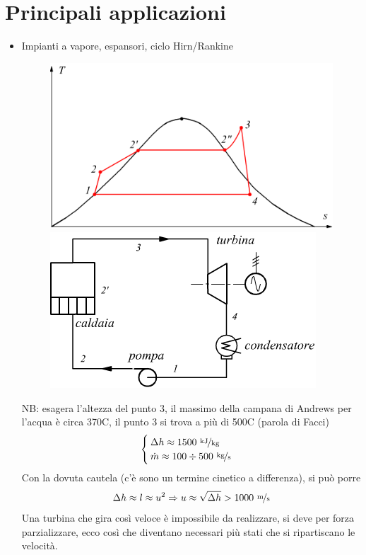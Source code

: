 \documentclass[a4paper, 15pt]{article}
\begin{document}
\newpage


 \section{Principali applicazioni}
\begin{adjustwidth}{2in}{}
	\begin{itemize}
		\item Impianti a vapore, espansori, ciclo Hirn/Rankine
		\begin{figure}[H]
			\centering
			\includegraphics[width=0.4\linewidth]{immagini/hirn2}
			\includegraphics[width=0.4\linewidth]{immagini/hirn}
			\label{fig:hirn2}
			\label{fig:hirn}
		\end{figure}
	NB: esagera l'altezza del punto 3, il massimo della campana di Andrews per l'acqua è circa 370\degree C, il punto 3 si trova a più di 500\degree C (parola di Facci)
		\[\begin{cases}
			\Delta h \approx 1500~\nicefrac{\text{kJ}}{\text{kg}} \\
			\dot{m} \approx 100\div500~\nicefrac{\text{kg}}{\text{s}}
		\end{cases}\]
	Con la dovuta cautela (c'è sono un termine cinetico a differenza), si può porre
	\[\Delta h \approx l \approx u^2 \Rightarrow u \approx \sqrt{\Delta h} >1000~\nicefrac{\text{m}}{\text{s}}\]
	Una turbina che gira così veloce è impossibile da realizzare, si deve per forza parzializzare, ecco così che diventano necessari più stati che si ripartiscano le velocità. 
	

\end{itemize}
\end{adjustwidth}
\end{document}
